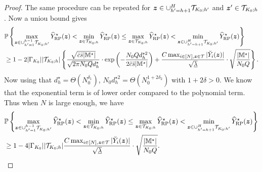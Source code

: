\documentclass[12pt]{article}
\begin{document}
\begin{proof}
The same procedure can be repeated for ${\boldsymbol{z}}\in\cup_{h'=h+1}^H{\mathcal{T}}_{K_0;h'}$ and ${\boldsymbol{z}}'\in{\mathcal{T}}_{K_0;h}$. Now a uniou bound gives 
\begin{align*}
    &{\mathbb{P}}\left\{\max_{{\boldsymbol{z}} \in \cup_{h' = 1}^{h-1} {\mathcal{T}}_{K_0;h'}}{\widehat{Y}}^\star_{\operatorname{RP}}({\boldsymbol{z}}) <\min_{{\boldsymbol{z}}\in{\mathcal{T}}_{K_0;h}}{\widehat{Y}}^\star_{\operatorname{RP}}({\boldsymbol{z}}) \le \max_{{\boldsymbol{z}}\in{\mathcal{T}}_{K_0;h}}{\widehat{Y}}^\star_{\operatorname{RP}}({\boldsymbol{z}})< \min_{{\boldsymbol{z}} \in \cup_{h' = h+1 }^H{\mathcal{T}}_{K_0;h'}} {\widehat{Y}}^\star_{\operatorname{RP}}({\boldsymbol{z}})\right\} \\
    &\ge 1 - 2|\Gamma_{K_0}||{\mathcal{T}}_{K_0;h}|\left\{\frac{\sqrt{\bar{c}\bar{s}|{\mathbb{M}}^\star|}}{\sqrt{2\pi N_0Q }d_h^\star}\cdot \exp\left(-\frac{ N_0Q d_h^{\star 2}}{2\bar{c}\bar{s}|{\mathbb{M}}^\star|}\right) + \frac{C \max_{i\in[N],{\boldsymbol{z}}\in{\mathcal{T}}}|\breve{Y}_i({\boldsymbol{z}})| }{\sqrt{\underline{\lambda}}}\cdot \sqrt{\frac{|{\mathbb{M}}^\star|}{N_0Q}}\right\}.
\end{align*}
Now using that $d_h^\star = \Theta(N_0^{\delta_1})$, $N_0d_h^{\star2} = \Theta(N_0^{1+2\delta_2})$ with $1+2\delta>0$.  We know that the exponential term is of lower order compared to the polynomial term. Thus when $N$ is large enough, we have
\begin{align}
    &{\mathbb{P}}\left\{\max_{{\boldsymbol{z}} \in \cup_{h' = 1}^{h-1} {\mathcal{T}}_{K_0;h'}}{\widehat{Y}}^\star_{\operatorname{RP}}({\boldsymbol{z}}) <\min_{{\boldsymbol{z}}\in{\mathcal{T}}_{K_0;h}}{\widehat{Y}}^\star_{\operatorname{RP}}({\boldsymbol{z}}) \le \max_{{\boldsymbol{z}}\in{\mathcal{T}}_{K_0;h}}{\widehat{Y}}^\star_{\operatorname{RP}}({\boldsymbol{z}})< \min_{{\boldsymbol{z}} \in \cup_{h' = h+1 }^H{\mathcal{T}}_{K_0;h'}} {\widehat{Y}}^\star_{\operatorname{RP}}({\boldsymbol{z}})\right\} \notag\\
    &\ge 1 - 4|\Gamma_{K_0}||{\mathcal{T}}_{K_0;h}|\frac{C \max_{i\in[N],{\boldsymbol{z}}\in{\mathcal{T}}}|\breve{Y}_i({\boldsymbol{z}})| }{\sqrt{\underline{\lambda}}}\cdot \sqrt{\frac{|{\mathbb{M}}^\star|}{N_0Q}}.\label{eqn:order-1}
\end{align}




\end{proof}
\end{document}
